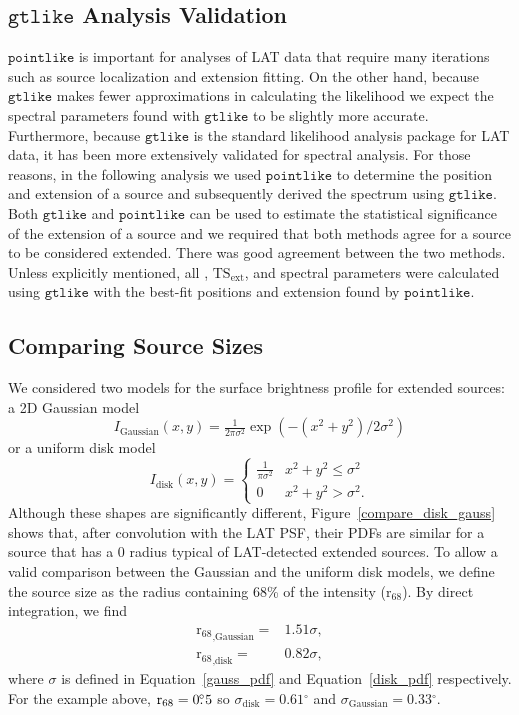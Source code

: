 \documentclass[12pt,preprint]{aastex}
\newcommand{\tsext}{{\ensuremath{\text{TS}_{\text{ext}}}}\xspace}
\newcommand{\rsixeight}{{\ensuremath{\text{r}_{68}}}\xspace}
\newcommand{\ts}{\text{TS}\xspace}
\newcommand{\gtlike}{\ensuremath{\mathtt{gtlike}}\xspace}
\newcommand{\pointlike}{\ensuremath{\mathtt{pointlike}}\xspace}
\newcommand{\degree}{\ensuremath{^\circ}\xspace}
\begin{document}
\subsection{\gtlike Analysis Validation}
\label{gtlike_crosscheck}

\pointlike is important for analyses of LAT data that require many iterations
such as source localization and extension fitting.  On the other hand,
because \gtlike makes fewer approximations in calculating the likelihood
we expect the spectral parameters found with \gtlike to be slightly more
accurate.  Furthermore, because \gtlike is the 
standard likelihood analysis package for LAT data, 
it has been more extensively validated for spectral analysis.
For those reasons, in the following analysis we used \pointlike to
determine the position and extension of a source and subsequently derived
the spectrum using \gtlike. Both \gtlike and \pointlike can be used to
estimate the statistical significance of the extension of a source and we
required that both methods agree for a source to be considered extended.
There was good agreement between the two methods.  Unless explicitly
mentioned, all \ts, \tsext, and spectral parameters were calculated using
\gtlike with the best-fit positions and extension found by \pointlike.


\subsection{Comparing Source Sizes}

\label{compare_source_size}

We considered two models for the
surface brightness profile for extended sources: a 2D Gaussian model
\begin{equation}\label{gauss_pdf}
  I_\text{Gaussian}(x,y)=\tfrac{1}{2\pi\sigma^2}\exp\left(-(x^2+y^2)/2\sigma^2\right)
\end{equation}
or a uniform disk model
\begin{equation}\label{disk_pdf}
  I_\text{disk}(x,y)=
  \begin{cases}
    \frac{1}{\pi\sigma^2} & x^2+y^2\le\sigma^2 \\
    0                      & x^2+y^2>\sigma^2.
  \end{cases}
\end{equation}
Although these shapes are significantly different,
Figure~\ref{compare_disk_gauss} shows that, after convolution with the
LAT PSF, their PDFs are similar for a source that has a 0 radius
typical of LAT-detected extended sources.  To allow a valid comparison
between the Gaussian and the uniform disk models,
we define the source size as the radius containing 68\% of the
intensity ($\rsixeight$). 
By direct integration, we find
\begin{align}
\rsixeight_\text{,Gaussian}=&1.51\sigma, \\
\rsixeight_\text{,disk}=&0.82\sigma, 
\end{align}
where $\sigma$ is defined
in Equation~\ref{gauss_pdf} and Equation~\ref{disk_pdf} respectively.
For the example above, $\rsixeight=0\fdg5$ so $\sigma_\text{disk}=0.61\degree$
and $\sigma_\text{Gaussian}=0.33\degree$.
\end{document}
